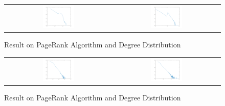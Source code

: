 \begin{figure}[H]
\begin{center}
\begin{tabular}{cc}
     \includegraphics[width=0.3\textwidth]{FIG/9pagerank.png} &
     \includegraphics[width=0.3\textwidth]{FIG/9degreedist.png} \\
\end{tabular}
\caption{Result on PageRank Algorithm and Degree Distribution}
\end{center}
\end{figure}

\begin{figure}[H]
\begin{center}
\begin{tabular}{cc}
     \includegraphics[width=0.3\textwidth]{FIG/1pagerank.png} &
     \includegraphics[width=0.3\textwidth]{FIG/1degreedist.png} \\
\end{tabular}
\caption{Result on PageRank Algorithm and Degree Distribution}
\end{center}
\end{figure}


